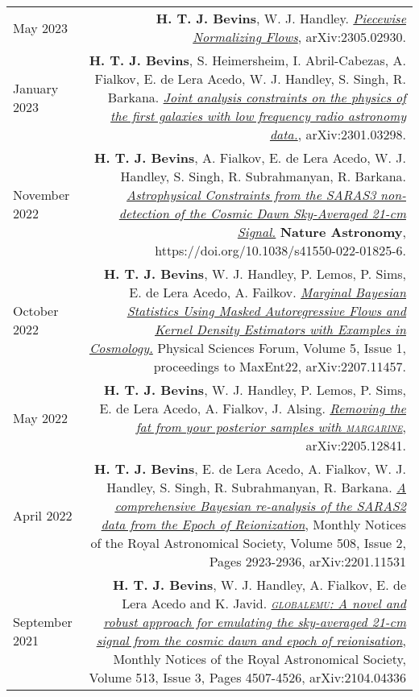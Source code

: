 \documentclass{article}
\begin{document}
\begin{tabular}{L!{\vrule}R}
    May 2023 & \textbf{H. T. J. Bevins}, W. J. Handley. \href{https://arxiv.org/abs/2305.02930}{\textit{Piecewise Normalizing Flows}}, arXiv:2305.02930. \\
    January 2023 & \textbf{H. T. J. Bevins}, S. Heimersheim, I. Abril-Cabezas, A. Fialkov, E. de Lera Acedo, W. J. Handley, S. Singh, R. Barkana. \href{https://arxiv.org/abs/2301.03298}{\textit{Joint analysis constraints on the physics of the first galaxies with low frequency radio astronomy data.}}, arXiv:2301.03298. \\
    November 2022 & \textbf{H. T. J. Bevins}, A. Fialkov, E. de Lera Acedo, W. J. Handley, S. Singh, R. Subrahmanyan, R. Barkana. \href{https://www.nature.com/articles/s41550-022-01825-6}{\textit{Astrophysical Constraints from the SARAS3 non-detection of the Cosmic Dawn Sky-Averaged 21-cm Signal.}} \textbf{Nature Astronomy}, https://doi.org/10.1038/s41550-022-01825-6.\\
	October 2022 & \textbf{H. T. J. Bevins}, W. J. Handley, P. Lemos, P. Sims, E. de Lera Acedo, A. Failkov. \href{https://www.mdpi.com/2673-9984/5/1/1#abstract}{\textit{Marginal Bayesian Statistics Using Masked Autoregressive Flows and Kernel Density Estimators with Examples in Cosmology.}} Physical Sciences Forum, Volume 5, Issue 1, proceedings to MaxEnt22, arXiv:2207.11457. \\
	May 2022 & \textbf{H. T. J. Bevins}, W. J. Handley, P. Lemos, P. Sims, E. de Lera Acedo, A. Fialkov, J. Alsing. \href{https://arxiv.org/abs/2205.12841}{\textit{Removing the fat from your posterior samples with \textsc{margarine}}}, arXiv:2205.12841. \\
	April 2022 & \textbf{H. T. J. Bevins}, E. de Lera Acedo, A. Fialkov, W. J. Handley, S. Singh, R. Subrahmanyan, R. Barkana. \href{https://doi.org/10.1093/mnras/stac1158}{\textit{A comprehensive Bayesian re-analysis of the SARAS2 data from the Epoch of Reionization}}, Monthly Notices of the Royal Astronomical Society, Volume 508, Issue 2, Pages 2923-2936, arXiv:2201.11531\\
	September 2021 & \textbf{H. T. J. Bevins}, W. J. Handley, A. Fialkov, E. de Lera Acedo and K. Javid. \href{https://doi.org/10.1093/mnras/stab2737}{\textit{\textsc{globalemu}: A novel and robust approach for emulating the sky-averaged 21-cm signal from the cosmic dawn and epoch of reionisation}}, Monthly Notices of the Royal Astronomical Society, Volume 513, Issue 3, Pages 4507-4526, arXiv:2104.04336 \\

\end{tabular}
\end{document}

